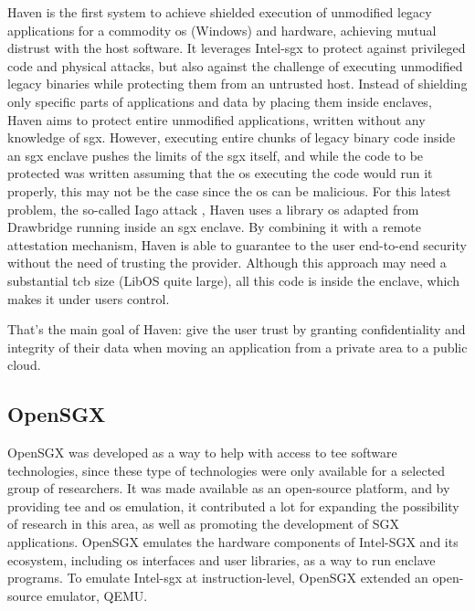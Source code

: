 Haven is the first system to achieve shielded execution of unmodified legacy applications for a commodity \gls{os} (Windows) and hardware, achieving mutual distrust with the host software.
It leverages Intel-\gls{sgx} to protect against privileged code and physical attacks, but also against the challenge of executing unmodified legacy binaries while protecting them from an untrusted host.
Instead of shielding only specific parts of applications and data by placing them inside enclaves, Haven aims to protect entire unmodified applications, written without any knowledge of \gls{sgx}. 
However, executing entire chunks of legacy binary code inside an \gls{sgx} enclave pushes the limits of the \gls{sgx} itself, and while the code to be protected was written assuming that the \gls{os} executing the code would run it properly, this may not be the case since the \gls{os} can be malicious. For this latest problem, the so-called Iago attack \cite{iagoAttacks}, Haven uses a library \gls{os} adapted from Drawbridge \cite{drawbridge} running inside an \gls{sgx} enclave. 
By combining it with a remote attestation mechanism, Haven is able to guarantee to the user end-to-end security without the need of trusting the provider.
Although this approach may need a substantial \gls{tcb} size (LibOS quite large), all this code is inside the enclave, which makes it under users control. 

That's the main goal of Haven: give the user trust by granting confidentiality and integrity of their data when moving an application from a private area to a public cloud. 


\subsection{OpenSGX}
\label{ssec:openSGX}

OpenSGX \cite{opensgx_paper} was developed as a way to help with access to \gls{tee} software technologies, since these type of technologies were only available for a selected group of researchers. 
It was made available as an open-source platform, and by providing \gls{tee} and \gls{os} emulation, it contributed a lot for expanding the possibility of research in this area, as well as promoting the development of SGX applications. 
OpenSGX emulates the hardware components of Intel-SGX and its ecosystem, including \gls{os} interfaces and user libraries, as a way to run enclave programs. To emulate Intel-\gls{sgx} at instruction-level, OpenSGX extended an open-source emulator, QEMU.

